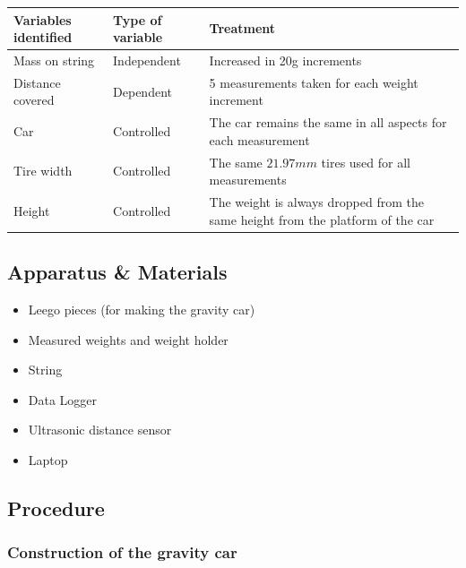 \documentclass[titlepage,12pt]{article}
\begin{document}
\begin{table}[h!]
    \centering
    \label{my-label}
    \begin{tabular}{l|l|p{5cm}}
        Variables identified & Type of variable   & Treatment\\
        \hline
        \hline
        Mass on string       & Independent        & Increased in 20g increments\\
        \hline
        Distance covered     & Dependent          & 5 measurements taken for each weight increment\\
        \hline
        Car                  & Controlled         & The car remains the same in all aspects for each measurement\\
        \hline
        Tire width           & Controlled         & The same $21.97mm$ tires used for all measurements\\
        \hline
        Height               & Controlled         & The weight is always dropped from the same height from the platform of the car\\
    \end{tabular}
\end{table}
\FloatBarrier

\subsection{Apparatus \& Materials}

\begin{itemize}
    \item Leego pieces (for making the gravity car)
    \item Measured weights and weight holder
    \item String
    \item Data Logger
    \item Ultrasonic distance sensor
    \item Laptop
\end{itemize}

\subsection{Procedure}

\subsubsection{Construction of the gravity car}
\end{document}
